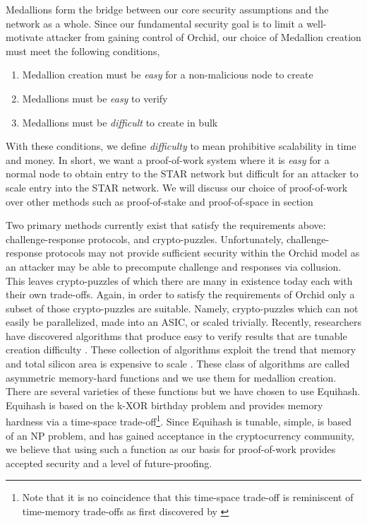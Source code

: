
Medallions form the bridge between our core security assumptions and the network as a whole. Since our fundamental security goal is to limit a well-motivate attacker from gaining control of Orchid, our choice of Medallion creation must meet the following conditions,
  \begin{enumerate}
      \item Medallion creation must be \textit{easy} for a non-malicious node to create
      \item Medallions  must be \textit{easy} to verify
      \item Medallions must be \textit{difficult} to create in bulk
  \end{enumerate}
With these conditions, we define \textit{difficulty} to mean prohibitive scalability in time and money. In short, we want a proof-of-work system where it is \textit{easy} for a normal node to obtain entry to the STAR network but difficult for an attacker to scale entry into the STAR network. We will discuss our choice of proof-of-work over other methods such as proof-of-stake %
and proof-of-space %
in section %

Two primary methods currently exist that satisfy the requirements above: challenge-response protocols, and crypto-puzzles. Unfortunately, challenge-response protocols may not provide sufficient security within the Orchid model as an attacker may be able to precompute challenge and responses via collusion. This leaves crypto-puzzles of which there are many in existence today \cite{nakamoto2008bitcoin, Equihash} each with their own trade-offs. Again, in order to satisfy the requirements of Orchid only a subset of those crypto-puzzles are suitable. Namely, crypto-puzzles which can not easily be parallelized, made into an ASIC, or scaled trivially. Recently, researchers have discovered algorithms that produce easy to verify results that are tunable creation difficulty \cite{Equihash}. These collection of algorithms exploit the trend that memory and total silicon area is expensive to scale \cite{abadi2005moderately, dwork2005pebbling}. These class of algorithms are called asymmetric memory-hard functions and we use them for medallion creation. There are several varieties of these functions \cite{tromp2014cuckoo, lorimermomentum, Equihash} but we have chosen to use Equihash. Equihash is based on the k-XOR birthday problem and provides memory hardness via a time-space trade-off\footnote{Note that it is no coincidence that this time-space trade-off is reminiscent of time-memory trade-offs as first discovered by \cite{hellman1980cryptanalytic}}. Since Equihash is tunable, simple, is based of an NP problem, and has gained acceptance in the cryptocurrency community, we believe that using such a function as our basis for proof-of-work provides accepted security and a level of future-proofing.

